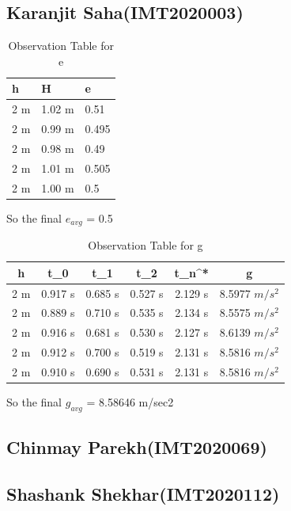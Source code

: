 \documentclass[11pt]{scrartcl} %
\begin{document}
\subsection{Karanjit Saha(IMT2020003)}
\begin{table}[h] %
	\centering %
	\begin{tabular}{l l l}
		\toprule
		\textbf{h} & \textbf{H} & \textbf{e} \\
		\midrule
		2 m & 1.02 m & 0.51\\
		2 m & 0.99 m  & 0.495\\
		2 m & 0.98 m  & 0.49\\
		2 m & 1.01 m & 0.505 \\
		2 m & 1.00 m & 0.5 \\
		\bottomrule
	\end{tabular}
	\caption{Observation Table for e}
\end{table}
So the final $e_{avg}$ = 0.5

\begin{table}[h]
\centering
\begin{tabular}{||c c c c c c||} 
\toprule
 \hline
 h & t_0 & t_1 & t_2 & t_n^* & g \\ [0.5ex] 
 \midrule
 \hline\hline
 2 m & 0.917 s & 0.685 s  & 0.527 s & 2.129 s & 8.5977 $m/s^2$  \\ 
 \hline
 2 m & 0.889 s & 0.710 s & 0.535 s & 2.134 s & 8.5575 $m/s^2$  \\
 \hline
 2 m & 0.916 s & 0.681 s & 0.530 s & 2.127 s  & 8.6139 $m/s^2$   \\
 \hline
 2 m & 0.912 s & 0.700 s & 0.519 s & 2.131 s  & 8.5816 $m/s^2$   \\
 \hline
 2 m & 0.910 s & 0.690 s & 0.531 s & 2.131 s  & 8.5816 $m/s^2$  \\ [1ex] 
 \bottomrule
 \hline
\end{tabular}
\caption{Observation Table for g}
\end{table}
So the final $g_{avg}$ = 8.58646 m/sec2


\subsection{Chinmay Parekh(IMT2020069)}
\subsection{Shashank Shekhar(IMT2020112)}
\end{document}
